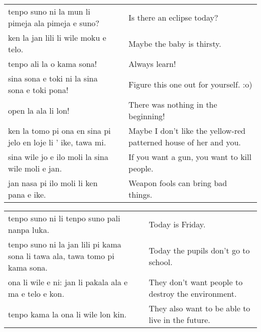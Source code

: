 \begin{supertabular}{p{5,5cm}|ll}
tenpo suno ni la mun li pimeja ala pimeja e suno? && Is there an eclipse today? \\
ken la jan lili li wile moku e telo.  && Maybe the baby is thirsty. \\
tenpo ali la o kama sona!  && Always learn!  \\
sina sona e toki ni la sina sona e toki pona!  && Figure this one out for yourself. :o) \\
open la ala li lon! && There was nothing in the beginning! \\
ken la tomo pi ona en sina pi jelo en loje li ' ike, tawa mi. &&  Maybe I don't like the yellow-red patterned house of her and you.  \\
sina wile jo e ilo moli la sina wile moli e jan. && If you want a gun, you want to kill people. \\
jan nasa pi ilo moli li ken pana e ike. && Weapon fools can bring bad things. \\
\end{supertabular}  

\begin{supertabular}{p{5,5cm}|ll}
tenpo suno ni li tenpo suno pali nanpa luka. && Today is Friday. \\ 
tenpo suno ni la jan lili pi kama sona li tawa ala, tawa tomo pi kama sona. && Today the pupils don't go to school. \\ 
ona li wile e ni: jan li pakala ala e ma e telo e kon. && They don't want people to destroy the environment. \\ 
tenpo kama la ona li wile lon kin. && They also want to be able to live in the future.  \\ 
\end{supertabular}

